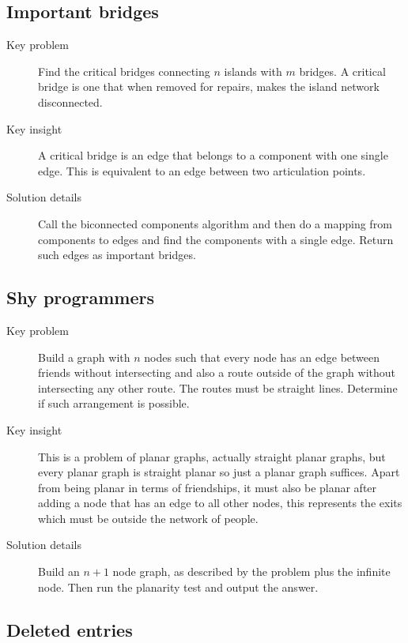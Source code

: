 \documentclass[11pt]{book}
\begin{document}
\subsection{Important bridges}

\begin{description}
	\item[Key problem] Find the critical bridges connecting $n$ islands with $m$ bridges. A critical bridge is one that when removed for repairs, makes the island network disconnected.
	\item[Key insight] A critical bridge is an edge that belongs to a component with one single edge. This is equivalent to an edge between two articulation points.
	\item[Solution details] Call the biconnected components algorithm and then do a mapping from components to edges and find the components with a single edge. Return such edges as important bridges.
\end{description}

\subsection{Shy programmers}

\begin{description}
	\item[Key problem] Build a graph with $n$ nodes such that every node has an edge between friends without intersecting and also a route outside of the graph without intersecting any other route. The routes must be straight lines. Determine if such arrangement is possible.
	\item[Key insight] This is a problem of planar graphs, actually straight planar graphs, but every planar graph is straight planar so just a planar graph suffices. Apart from being planar in terms of friendships, it must also be planar after adding a node that has an edge to all other nodes, this represents the exits which must be outside the network of people.
	\item[Solution details] Build an $n+1$ node graph, as described by the problem plus the infinite node. Then run the planarity test and output the answer.
\end{description}

\subsection{Deleted entries}
\end{document}
